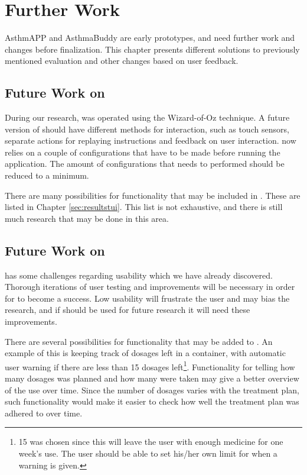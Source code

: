 \chapter{Further Work}
\label{chp:futurework}

AsthmAPP and AsthmaBuddy are early prototypes, and need further work and changes before finalization. This chapter presents different solutions to previously mentioned evaluation and other changes based on user feedback.

\section{Future Work on \ab{}}
\label{sec:futureworkab}
During our research, \ab{} was operated using the Wizard-of-Oz technique. A future version of \ab{} should have different methods for interaction, such as touch sensors, separate actions for replaying instructions and feedback on user interaction. \ab{} now relies on a couple of configurations that have to be made before running the application. The amount of configurations that needs to performed should be reduced to a minimum.  

There are many possibilities for functionality that may be included in \ab{}. These are listed in Chapter \ref{sec:resultstui}. This list is not exhaustive, and there is still much research that may be done in this area.


\section{Future Work on \app{}}
\label{sec:futureworkapp}
\app{} has some challenges regarding usability which we have already discovered. 
Thorough iterations of user testing and improvements will be necessary in order for \app{} to become a success. Low usability will frustrate the user and may bias the research, and if \app{} should be used for future research it will need these improvements. 

There are several possibilities for functionality that may be added to \app{}. An example of this is keeping track of dosages left in a container, with automatic user warning if there are less than 15 dosages left\footnote{15 was chosen since this will leave the user with enough medicine for one week's use. The user should be able to set his/her own limit for when a warning is given.}. Functionality for telling how many dosages was planned and how many were taken may give a better overview of the use over time. Since the number of dosages varies with the treatment plan, such functionality would make it easier to check how well the treatment plan was adhered to over time. 

